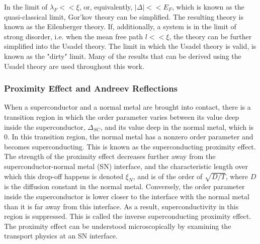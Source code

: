In the limit of $\lambda_F << \xi$, or, equivalently, $|\Delta| << E_F$, which is known as the quasi-classical limit, Gor'kov theory can be simplified. The resulting theory is known as the Eilenberger theory. If, additionally, a system is in the limit of strong disorder, i.e. when the mean free path $l << \xi$, the theory can be further simplified into the Usadel theory. The limit in which the Usadel theory is valid, is known as the "dirty" limit. Many of the results that can be derived using the Usadel theory are used throughout this work.

\subsubsection{Proximity Effect and Andreev Reflections}
When a superconductor and a normal metal are brought into contact, there is a transition region in which the order parameter varies between its value deep inside the superconductor, $\Delta_{SC}$, and its value deep in the normal metal, which is 0. In this transition region, the normal metal has a nonzero order parameter and becomes superconducting. This is known as the superconducting proximity effect. The strength of the proximity effect decreases further away from the superconductor-normal metal (SN) interface, and the characteristic length over which this drop-off happens is denoted $\xi_N$, and is of the order of $\sqrt{D/T}$, where $D$ is the diffusion constant in the normal metal. Conversely, the order parameter inside the superconductor is lower closer to the interface with the normal metal than it is far away from this interface. As a result, superconductivity in this region is suppressed. This is called the inverse superconducting proximity effect. The proximity effect can be understood microscopically by examining the transport physics at an SN interface.
 

